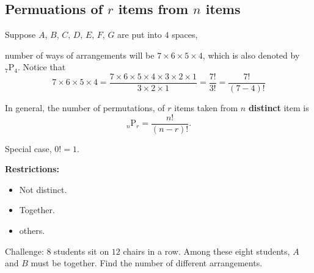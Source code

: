 \subsection{Permuations of $r$ items from $n$ items}

Suppose $A$, $B$, $C$, $D$, $E$, $F$, $G$ are put into $4$ spaces,
\medskip


\medskip

number of ways of arrangements will be $7\times 6 \times 5 \times 4$, which is also denoted by $_{7}\text{P}_4$. Notice that 
\[
7\times 6 \times 5 \times 4=\frac{7\times 6 \times 5 \times 4 \times 3 \times 2 \times 1}{3 \times 2 \times 1} = \frac{7!}{3!} = \frac{7!}{(7-4)!}
\]

In general, the number of permutations, of $r$ items taken from $n$ \textbf{distinct} item is 
\[
_{n}\text{P}_r = \frac{n!}{(n-r)!}.
\]

Special case, $0! =1$.

\medskip

\textbf{Restrictions:}

\begin{itemize}
	\setlength\itemsep{2.5em}
	\item  Not distinct.
	\item  Together.
	\item  others.
	
\end{itemize}

\bigskip

Challenge:  $8$ students sit on $12$ chairs in a row. Among these eight students, $A$ and $B$ must be together. Find the number of different arrangements.

\bigskip

\bigskip

\bigskip

\exercise  %
 
